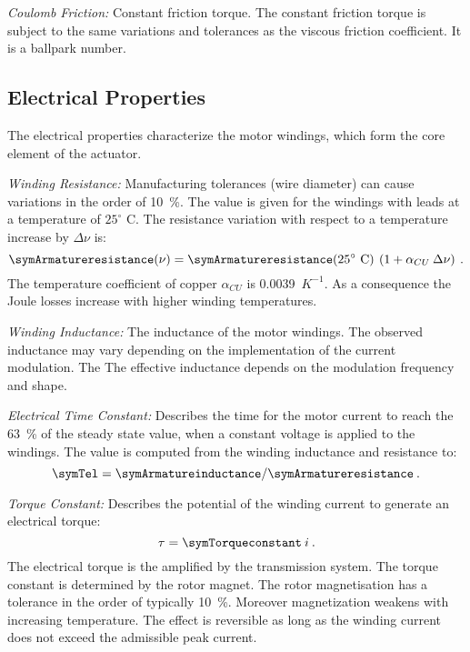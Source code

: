 \documentclass[a4paper,10pt]{cjtdsheet}      %
\begin{document}
\begin{multicols}{2}
\emph{Coulomb Friction:} Constant friction torque. The constant friction torque is subject to the same variations and tolerances as the viscous friction coefficient. It is a ballpark number.

%
%
\subsection*{Electrical Properties}
The electrical properties characterize the motor windings, which form the core element of the actuator. 

\emph{Winding Resistance:} Manufacturing tolerances (wire diameter) can cause variations in the order of 10~\%. The value is given for the windings with leads at a temperature of $25^{\circ}$ C. The resistance variation with respect to a temperature increase by $\Delta \nu$ is:
\begin{equation}
	\symArmatureresistance(\nu) = \symArmatureresistance(25^\circ\text{ C})\:\left(1+\alpha_{CU} 	\: \Delta \nu\right)	\:.
\end{equation}
The temperature coefficient of copper $\alpha_{CU}$ is 0.0039~$K^{-1}$. As a consequence the Joule losses increase with higher winding temperatures.
 
\emph{Winding Inductance:} The inductance of the motor windings. The observed inductance may vary depending on the implementation of the current modulation. The The effective inductance depends on the modulation frequency and shape.

\emph{Electrical Time Constant:} Describes the time for the motor current to reach the 63~\% of the steady state value, when a constant voltage is applied to the windings. The value is computed from the winding inductance and resistance to:
\begin{equation}
\symTel = \symArmatureinductance / \symArmatureresistance\:.
\end{equation}

\emph{Torque Constant:} Describes the potential of the winding current to generate an electrical torque:
\begin{equation}
	\tau = \symTorqueconstant \: i\:.
\end{equation}
The electrical torque is the amplified by the transmission system. The torque constant is determined by the rotor magnet. The rotor magnetisation has a tolerance in the order of typically 10~\%. Moreover magnetization weakens with increasing temperature. The effect is reversible as long as the winding current does not exceed the admissible peak current.


\end{multicols}
\end{document}
